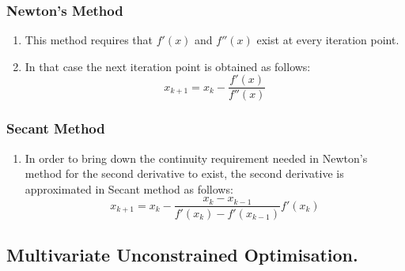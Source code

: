 \documentclass[12pt,a4paper,titlepage]{article}
\begin{document}
\subsubsection{Newton's Method}
\begin{enumerate}
    \item This method requires that $f'(x)$ and $f''(x)$ exist at every iteration point.
    \item In that case the next iteration point is obtained as follows:
\begin{equation}
   x_{k+1}= x_{k}-\frac{f'(x)}{f''(x)}
\end{equation}
    \end{enumerate}
\subsubsection{Secant Method}
\begin{enumerate}
    \item In order to bring down the continuity requirement needed in Newton's method for the second derivative to exist, the second derivative is approximated in Secant method as follows: 
    \begin{equation}
   x_{k+1}= x_{k}-\frac{x_{k}-x_{k-1}}{f'(x_{k})-f'(x_{k-1})}f'(x_{k})
\end{equation}
\end{enumerate}

\subsection{Multivariate Unconstrained Optimisation.}
\end{document}

